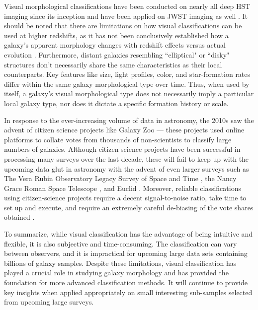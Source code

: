 Visual morphological classifications have been conducted on nearly all deep HST imaging since its inception \citep[e.g.,][]{vdb_96, lee_13, kartaltepe_15} and have been applied on JWST imaging as well \citep[e.g.,][]{kartaltepe_23}. It should be noted that there are limitations on how visual classifications can be used at higher redshifts, as it has not been conclusively established how a galaxy's apparent morphology changes with redshift effects versus actual evolution \citep[e.g.,][]{morph_review}. Furthermore, distant galaxies resembling ``elliptical" or ``disky" structures don't necessarily share the same characteristics as their local counterparts. Key features like size, light profiles, color, and star-formation rates differ within the same galaxy morphological type over time. Thus, when used by itself, a galaxy's visual morphological type does not necessarily imply a particular local galaxy type, nor does it dictate a specific formation history or scale.

In response to the ever-increasing volume of data in astronomy, the 2010s saw the advent of citizen science projects like Galaxy Zoo \citep{gzoo_original} --- these projects used online platforms to collate votes from thousands of non-scientists to classify large numbers of galaxies. Although citizen science projects have been successful in processing many surveys over the last decade, these will fail to keep up with the upcoming data glut in astronomy with the advent of even larger surveys such as The Vera Rubin Observatory Legacy Survey of Space and Time \citep[LSST;][]{lsst}, the Nancy Grace Roman Space Telescope \citep[NGRST;][]{ngrst}, and Euclid \citep{euclid}. Moreover, reliable  classifications using citizen-science projects require a decent signal-to-noise ratio, take time to set up and execute, and require an extremely careful de-biasing of the vote shares obtained \citep[e.g.,][]{gzoo_original,gzoo_candels}. 

To summarize, while visual classification has the advantage of being intuitive and flexible, it is also subjective and time-consuming. The classification can vary between observers, and it is impractical for upcoming large data sets containing billions of galaxy samples. Despite these limitations, visual classification has played a crucial role in studying galaxy morphology and has provided the foundation for more advanced classification methods. It will continue to provide key insights when applied appropriately on small interesting sub-samples selected from upcoming large surveys. 

